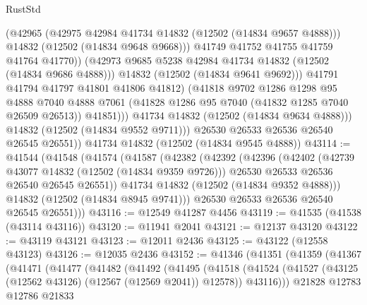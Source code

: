 \begin{lexlean}{RustStd}
\begin{coremodule}
                        (@42965
                          (@42975 @42984 @41734 @14832 (@12502 (@14834 @9657 @4888)))
                          @14832
                          (@12502 (@14834 @9648 @9668)))
                        @41749
                        @41752
                        @41755
                        @41759
                        @41764
                        @41770))
                    (@42973 @9685 @5238 @42984 @41734 @14832 (@12502 (@14834 @9686 @4888)))
                    @14832
                    (@12502 (@14834 @9641 @9692)))
                  @41791
                  @41794
                  @41797
                  @41801
                  @41806
                  @41812)
                (@41818
                  @9702
                  @1286
                  @1298
                  @95
                  @4888
                  @7040
                  @4888
                  @7061
                  (@41828 @1286 @95 @7040 (@41832 @1285 @7040 @26509 @26513))
                  @41851)))
            @41734
            @14832
            (@12502 (@14834 @9634 @4888)))
          @14832
          (@12502 (@14834 @9552 @9711)))
        @26530
        @26533
        @26536
        @26540
        @26545
        @26551))
    @41734
    @14832
    (@12502 (@14834 @9545 @4888))
@43114 := @41544
    (@41548
      (@41574
        (@41587
          (@42382
            (@42392
              (@42396
                (@42402
                  (@42739 @43077 @14832 (@12502 (@14834 @9359 @9726)))
                  @26530
                  @26533
                  @26536
                  @26540
                  @26545
                  @26551))
              @41734
              @14832
              (@12502 (@14834 @9352 @4888)))
            @14832
            (@12502 (@14834 @8945 @9741)))
          @26530
          @26533
          @26536
          @26540
          @26545
          @26551)))
@43116 := @12549 @41287 @4456
@43119 := @41535 (@41538 (@43114 @43116))
@43120 := @11941 @2041
@43121 := @12137 @43120
@43122 := @43119 @43121
@43123 := @12011 @2436
@43125 := @43122 (@12558 @43123)
@43126 := @12035 @2436
@43152 := @41346
    (@41351
      (@41359
        (@41367
          (@41471
            (@41477
              (@41482
                (@41492
                  (@41495
                    (@41518
                      (@41524
                        (@41527 (@43125 (@12562 @43126) (@12567 (@12569 @2041)) @12578))
                        @43116)))
                  @21828
                  @12783
                  @12786
                  @21833

\end{coremodule}
\end{lexlean}
